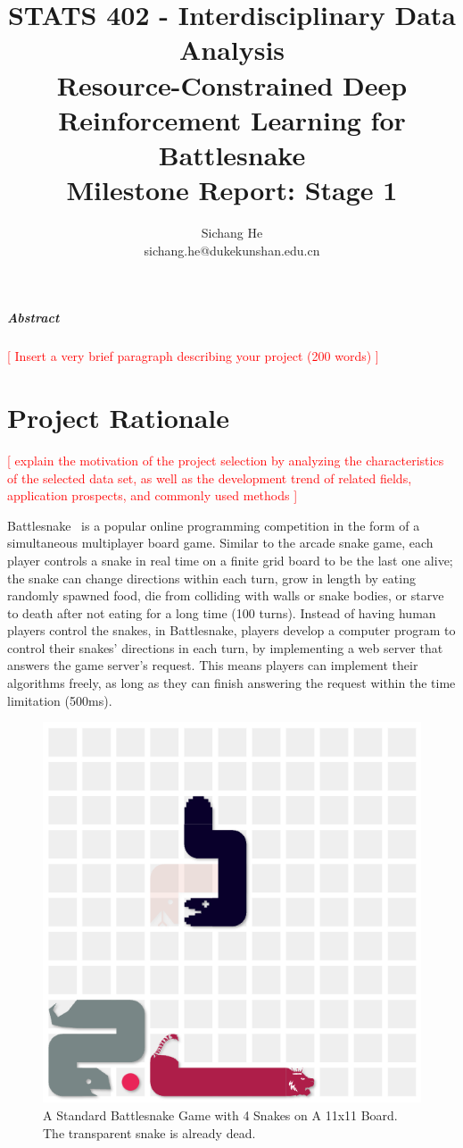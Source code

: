 \documentclass[a4paper]{article}
\title{STATS 402 - Interdisciplinary Data Analysis\\
    Resource-Constrained Deep Reinforcement Learning for Battlesnake\\
    Milestone Report: Stage 1
}
\author{Sichang He\\
    sichang.he@dukekunshan.edu.cn
}
\newcommand{\todo}[1]{\textcolor{red}{[ #1 ]}}
\begin{document}
\maketitle

\subparagraph{Abstract}

\todo{Insert a very brief paragraph describing your project (200 words)}

\section{Project Rationale}

\todo{explain the motivation of the project
    selection by analyzing the characteristics of the selected data set,
    as well as the development trend of related fields, application prospects,
    and commonly used methods}

Battlesnake~\cite{battlesnake}
is a popular online programming competition in the form of a simultaneous
multiplayer board game. Similar to the arcade snake game,
each player controls a snake in real time on a finite grid board to be the last
one alive; the snake can change directions within each turn,
grow in length by eating randomly spawned food,
die from colliding with walls or snake bodies,
or starve to death after not eating for a long time (100 turns).
Instead of having human players control the snakes, in Battlesnake,
players develop a computer program to control their snakes' directions in each
turn, by implementing a web server that answers the game server's request.
This means players can implement their algorithms freely,
as long as they can finish answering the request within the time limitation
(500ms).

\begin{figure}
    \centering
    \includegraphics[width=0.4\linewidth]{snake_game_screenshot.png}
    \caption{A Standard Battlesnake Game with 4 Snakes on A 11x11 Board.
        The transparent snake is already dead.
    }
    \label{fig:game}
\end{figure}
\end{document}
